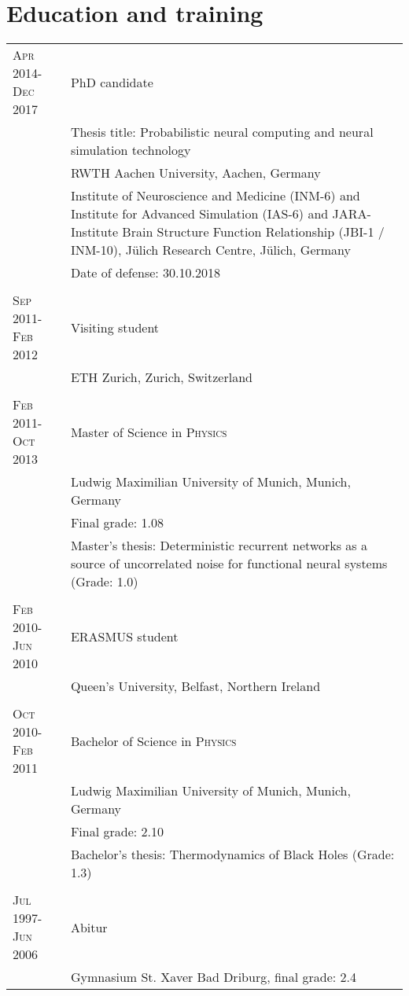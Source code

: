 \section{Education and training}

\begin{longtable}{>{\hfill}p{3.3cm}|p{12.0cm}}
  \textsc{Apr} 2014-\textsc{Dec} 2017 & PhD candidate \\
  & \footnotesize Thesis title: Probabilistic neural computing and neural simulation technology \\
  & \footnotesize RWTH Aachen University, Aachen, Germany \\
  & \footnotesize Institute of Neuroscience and Medicine (INM-6) and Institute for Advanced Simulation (IAS-6) and JARA-Institute Brain Structure Function Relationship (\mbox{JBI-1} / INM-10), J\"ulich Research Centre, J\"ulich, Germany \\
  & \footnotesize Date of defense: 30.10.2018 \\
  \multicolumn{2}{c}{} \\
  \textsc{Sep} 2011-\textsc{Feb} 2012 & Visiting student \\
  & \footnotesize{ETH Zurich, Zurich, Switzerland} \\
  \multicolumn{2}{c}{} \\
  \textsc{Feb} 2011-\textsc{Oct} 2013 & Master of Science in \textsc{Physics} \\
  & \footnotesize Ludwig Maximilian University of Munich, Munich, Germany \\
  & \footnotesize Final grade: 1.08 \\
  & \footnotesize Master's thesis: Deterministic recurrent networks as
  a source of uncorrelated noise for
  functional neural systems (Grade: 1.0) \\
  \multicolumn{2}{c}{} \\
  \textsc{Feb} 2010-\textsc{Jun} 2010 & ERASMUS student \\
  & \footnotesize Queen's University, Belfast, Northern Ireland \\
  \multicolumn{2}{c}{} \\
  \textsc{Oct} 2010-\textsc{Feb} 2011 & Bachelor of Science in \textsc{Physics} \\
  & \footnotesize Ludwig Maximilian University of Munich, Munich, Germany \\
  & \footnotesize Final grade: 2.10 \\
  & \footnotesize Bachelor's thesis: Thermodynamics of Black Holes (Grade: 1.3) \\
  \multicolumn{2}{c}{} \\
  \textsc{Jul} 1997-\textsc{Jun} 2006 & Abitur \\
  & \footnotesize Gymnasium St. Xaver Bad Driburg, final grade: 2.4
\end{longtable}
